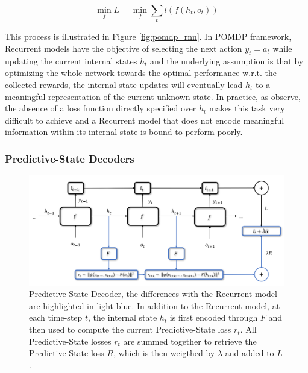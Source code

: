                 \[ \min_{f} L = \min_{f} \sum_{t} l(f(h_t, o_t)) \]
                
                \noindent
                This process is illustrated in Figure \ref{fig:pomdp_rnn}. In POMDP framework, Recurrent models have the objective of selecting the next action $y_t = a_t$ while updating the current internal states $h_t$ and the underlying assumption is that by optimizing the whole network towards the optimal performance w.r.t. the collected rewards, the internal state updates will eventually lead $h_t$ to a meaningful representation of the current unknown state. In practice, as  observe, the absence of a loss function directly specified over $h_t$ makes this task very difficult to achieve and a Recurrent model that does not encode meaningful information within its internal state is bound to perform poorly.
                
            \subsubsection{Predictive-State Decoders}
            
                \begin{figure}[t]
                    \centering
                    \includegraphics[width=15cm, keepaspectratio]{images/pomdp/pomdp_psd.png}
                    \caption{Predictive-State Decoder, the differences with the Recurrent model are highlighted in light blue. In addition to the Recurrent model, at each time-step $t$, the internal state $h_t$ is first encoded through $F$ and then used to compute the current Predictive-State loss $r_t$. All Predictive-State losses $r_t$ are summed together to retrieve the Predictive-State loss $R$, which is then weigthed by $\lambda$ and added to $L$.}
                    \label{fig:pomdp_psd}
                \end{figure}
            
